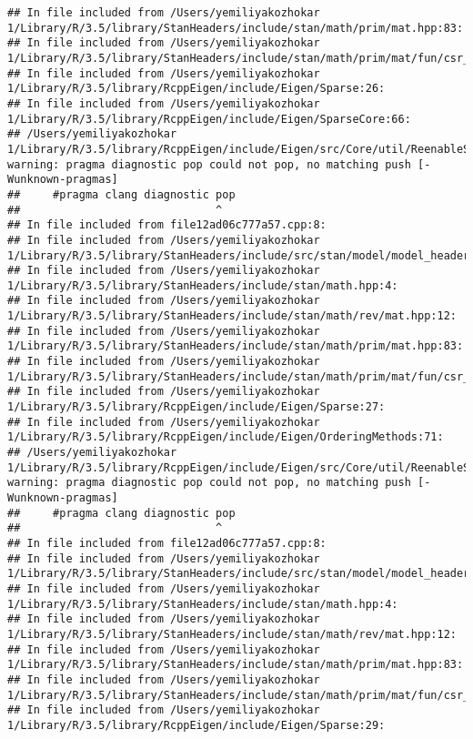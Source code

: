 \documentclass[]{article}
\begin{document}
\begin{verbatim}
## In file included from /Users/yemiliyakozhokar 1/Library/R/3.5/library/StanHeaders/include/stan/math/prim/mat.hpp:83:
## In file included from /Users/yemiliyakozhokar 1/Library/R/3.5/library/StanHeaders/include/stan/math/prim/mat/fun/csr_extract_u.hpp:6:
## In file included from /Users/yemiliyakozhokar 1/Library/R/3.5/library/RcppEigen/include/Eigen/Sparse:26:
## In file included from /Users/yemiliyakozhokar 1/Library/R/3.5/library/RcppEigen/include/Eigen/SparseCore:66:
## /Users/yemiliyakozhokar 1/Library/R/3.5/library/RcppEigen/include/Eigen/src/Core/util/ReenableStupidWarnings.h:10:30: warning: pragma diagnostic pop could not pop, no matching push [-Wunknown-pragmas]
##     #pragma clang diagnostic pop
##                              ^
## In file included from file12ad06c777a57.cpp:8:
## In file included from /Users/yemiliyakozhokar 1/Library/R/3.5/library/StanHeaders/include/src/stan/model/model_header.hpp:4:
## In file included from /Users/yemiliyakozhokar 1/Library/R/3.5/library/StanHeaders/include/stan/math.hpp:4:
## In file included from /Users/yemiliyakozhokar 1/Library/R/3.5/library/StanHeaders/include/stan/math/rev/mat.hpp:12:
## In file included from /Users/yemiliyakozhokar 1/Library/R/3.5/library/StanHeaders/include/stan/math/prim/mat.hpp:83:
## In file included from /Users/yemiliyakozhokar 1/Library/R/3.5/library/StanHeaders/include/stan/math/prim/mat/fun/csr_extract_u.hpp:6:
## In file included from /Users/yemiliyakozhokar 1/Library/R/3.5/library/RcppEigen/include/Eigen/Sparse:27:
## In file included from /Users/yemiliyakozhokar 1/Library/R/3.5/library/RcppEigen/include/Eigen/OrderingMethods:71:
## /Users/yemiliyakozhokar 1/Library/R/3.5/library/RcppEigen/include/Eigen/src/Core/util/ReenableStupidWarnings.h:10:30: warning: pragma diagnostic pop could not pop, no matching push [-Wunknown-pragmas]
##     #pragma clang diagnostic pop
##                              ^
## In file included from file12ad06c777a57.cpp:8:
## In file included from /Users/yemiliyakozhokar 1/Library/R/3.5/library/StanHeaders/include/src/stan/model/model_header.hpp:4:
## In file included from /Users/yemiliyakozhokar 1/Library/R/3.5/library/StanHeaders/include/stan/math.hpp:4:
## In file included from /Users/yemiliyakozhokar 1/Library/R/3.5/library/StanHeaders/include/stan/math/rev/mat.hpp:12:
## In file included from /Users/yemiliyakozhokar 1/Library/R/3.5/library/StanHeaders/include/stan/math/prim/mat.hpp:83:
## In file included from /Users/yemiliyakozhokar 1/Library/R/3.5/library/StanHeaders/include/stan/math/prim/mat/fun/csr_extract_u.hpp:6:
## In file included from /Users/yemiliyakozhokar 1/Library/R/3.5/library/RcppEigen/include/Eigen/Sparse:29:

\end{verbatim}
\end{document}
